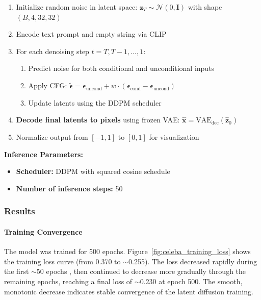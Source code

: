 \begin{enumerate}
    \item Initialize random noise in latent space: $\mathbf{z}_T \sim \mathcal{N}(0, \mathbf{I})$ with shape $(B, 4, 32, 32)$
    \item Encode text prompt and empty string via CLIP
    \item For each denoising step $t = T, T-1, \ldots, 1$:
    \begin{enumerate}
        \item Predict noise for both conditional and unconditional inputs
        \item Apply CFG: $\tilde{\boldsymbol{\epsilon}} = \boldsymbol{\epsilon}_\text{uncond} + w \cdot (\boldsymbol{\epsilon}_\text{cond} - \boldsymbol{\epsilon}_\text{uncond})$
        \item Update latents using the DDPM scheduler
    \end{enumerate}
    \item \textbf{Decode final latents to pixels} using frozen VAE: $\hat{\mathbf{x}} = \text{VAE}_{\text{dec}}(\hat{\mathbf{z}}_0)$
    \item Normalize output from $[-1, 1]$ to $[0, 1]$ for visualization
\end{enumerate}

\textbf{Inference Parameters:}
\begin{itemize}
    \item \textbf{Scheduler:} DDPM with squared cosine schedule
    \item \textbf{Number of inference steps:} 50
\end{itemize}

\subsubsection{Results}

\paragraph{Training Convergence}

The model was trained for 500 epochs. Figure~\ref{fig:celeba_training_loss} shows the training loss curve (from 0.370 to $\sim$0.255). The loss decreased rapidly during the first $\sim$50 epochs , then continued to decrease more gradually through the remaining epochs, reaching a final loss of $\sim$0.230 at epoch 500. The smooth, monotonic decrease indicates stable convergence of the latent diffusion training.

